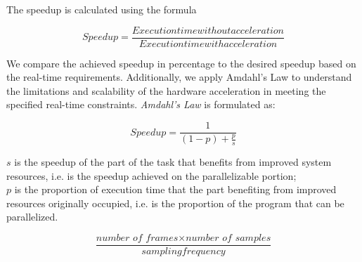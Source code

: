 \documentclass{article}
\begin{document}
The speedup is calculated using the formula

\begin{equation}
    Speedup = \frac{Execution time without acceleration}{Execution time with acceleration} 
\end{equation}

We compare the achieved speedup in percentage to the desired speedup based on the real-time requirements. Additionally, we apply Amdahl's Law to understand the limitations and scalability of the hardware acceleration in meeting the specified real-time constraints. \textit{Amdahl's Law} is formulated as:

\begin{equation}
    Speedup = \frac{1}{(1 - p) + \frac{p}{s}} 
\end{equation}

$s$ is the speedup of the part of the task that benefits from improved system resources, i.e. is the speedup achieved on the parallelizable portion;\\
$p$ is the proportion of execution time that the part benefiting from improved resources originally occupied, i.e. is the proportion of the program that can be parallelized.

\begin{equation}
    \frac{\textit{number of frames} \times \textit{number of samples}}{sampling frequency} 
\end{equation}
\end{document}

